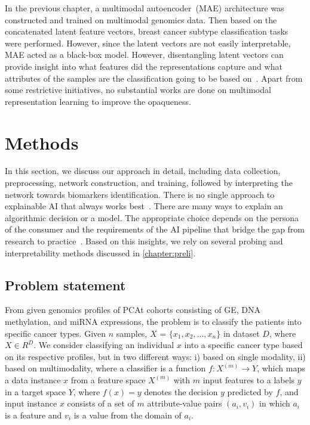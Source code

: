 \hspace*{3.5mm} In the previous chapter, a multimodal autoencoder~(MAE) architecture was constructed and trained on multimodal genomics data. Then based on the concatenated latent feature vectors, breast cancer subtype classification tasks were performed. However, since the latent vectors are not easily interpretable, MAE acted as a black-box model. However, disentangling latent vectors can provide insight into what features did the representations capture and what attributes of the samples are the classification going to be based on~\cite{karimTCBB2020}. 
Apart from some restrictive initiatives, no substantial works are done on multimodal representation learning to improve the opaqueness.

\section{Methods}\label{chapter_5:mm}
In this section, we discuss our approach in detail, including data collection, preprocessing, network construction, and training, followed by interpreting the network towards biomarkers identification. There is no single approach to explainable AI that always works best~\cite{arya2019one}. There are many ways to explain an algorithmic decision or a model. The appropriate choice depends on the persona of the consumer and the requirements of the AI pipeline that bridge the gap from research to practice~\cite{arya2019one}. Based on this insights, we rely on several probing and interpretability methods discussed in \cref{chapter:preli}. 

\subsection{Problem statement}
From given genomics profiles of PCAt cohorts consisting of GE, DNA methylation, and miRNA expressions, the problem is to classify the patients into specific cancer types. Given $n$ samples, $X$ = ${{\{x_1,x_2, ..., x_n}}\}$ in dataset $D$, where $X \in {R}^{D}$. We consider classifying an individual $x$ into a specific cancer type based on its respective profiles, but in two different ways: i) based on single modality, ii) based on multimodality, where a  classifier is a function $f: {X}^{(m)} \rightarrow {Y}$, which maps a data instance $x$ from a feature space ${X}^{(m)}$ with $m$ input features to a labels $y$ in a target space ${Y}$, where $f(x)=y$ denotes the decision $y$ predicted by $f$, and input instance $x$ consists of a set of $m$ attribute-value pairs $\left(a_{i}, v_{i}\right)$ in which $a_i$ is a feature and $v_i$ is a value from the domain of $a_i$. 

